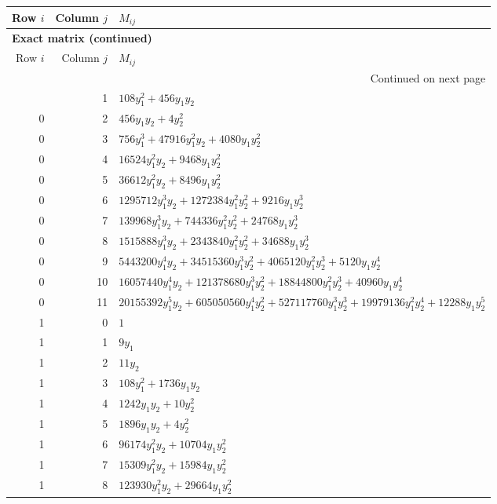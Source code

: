 \documentclass[10pt,a4paper]{article}
\begin{document}
{\small\setlength{\tabcolsep}{7pt}\begin{longtable}{rrp{125mm}}
\toprule Row $i$ & Column $j$ & $M_{ij}$\\\midrule\endfirsthead
\multicolumn{3}{l}{\textbf{Exact matrix (continued)}}\\
\toprule Row $i$ & Column $j$ & $M_{ij}$\\\midrule\endhead
\midrule\multicolumn{3}{r}{Continued on next page}\\\endfoot\bottomrule\endlastfoot
0 & 1 & $108 y_{1}^{2} + 456 y_{1} y_{2}$\\
0 & 2 & $456 y_{1} y_{2} + 4 y_{2}^{2}$\\
0 & 3 & $756 y_{1}^{3} + 47916 y_{1}^{2} y_{2} + 4080 y_{1} y_{2}^{2}$\\
0 & 4 & $16524 y_{1}^{2} y_{2} + 9468 y_{1} y_{2}^{2}$\\
0 & 5 & $36612 y_{1}^{2} y_{2} + 8496 y_{1} y_{2}^{2}$\\
0 & 6 & $1295712 y_{1}^{3} y_{2} + 1272384 y_{1}^{2} y_{2}^{2} + 9216 y_{1} y_{2}^{3}$\\
0 & 7 & $139968 y_{1}^{3} y_{2} + 744336 y_{1}^{2} y_{2}^{2} + 24768 y_{1} y_{2}^{3}$\\
0 & 8 & $1515888 y_{1}^{3} y_{2} + 2343840 y_{1}^{2} y_{2}^{2} + 34688 y_{1} y_{2}^{3}$\\
0 & 9 & $5443200 y_{1}^{4} y_{2} + 34515360 y_{1}^{3} y_{2}^{2} + 4065120 y_{1}^{2} y_{2}^{3} + 5120 y_{1} y_{2}^{4}$\\
0 & 10 & $16057440 y_{1}^{4} y_{2} + 121378680 y_{1}^{3} y_{2}^{2} + 18844800 y_{1}^{2} y_{2}^{3} + 40960 y_{1} y_{2}^{4}$\\
0 & 11 & $20155392 y_{1}^{5} y_{2} + 605050560 y_{1}^{4} y_{2}^{2} + 527117760 y_{1}^{3} y_{2}^{3} + 19979136 y_{1}^{2} y_{2}^{4} + 12288 y_{1} y_{2}^{5}$\\
1 & 0 & $1$\\
1 & 1 & $9 y_{1}$\\
1 & 2 & $11 y_{2}$\\
1 & 3 & $108 y_{1}^{2} + 1736 y_{1} y_{2}$\\
1 & 4 & $1242 y_{1} y_{2} + 10 y_{2}^{2}$\\
1 & 5 & $1896 y_{1} y_{2} + 4 y_{2}^{2}$\\
1 & 6 & $96174 y_{1}^{2} y_{2} + 10704 y_{1} y_{2}^{2}$\\
1 & 7 & $15309 y_{1}^{2} y_{2} + 15984 y_{1} y_{2}^{2}$\\
1 & 8 & $123930 y_{1}^{2} y_{2} + 29664 y_{1} y_{2}^{2}$\\

\end{longtable}}
\end{document}
